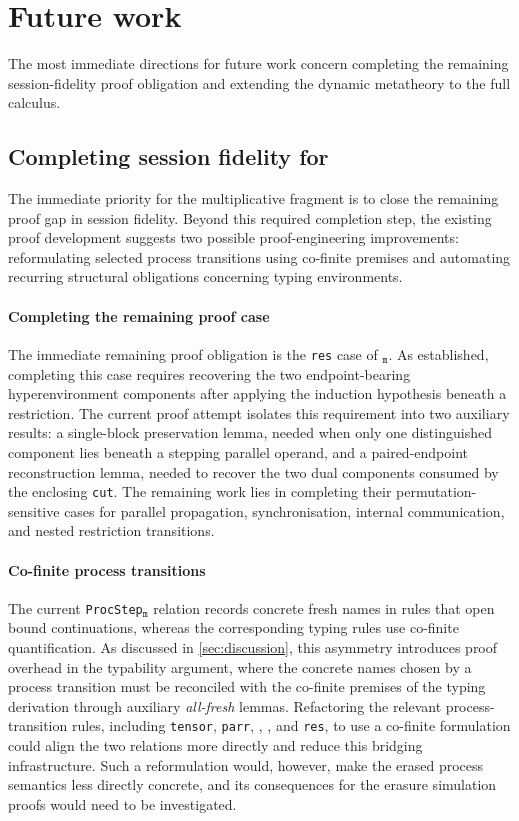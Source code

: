 \section{Future work}\label{sec:future}
The most immediate directions for future work concern completing the remaining session-fidelity proof obligation and extending the dynamic metatheory to the full \pill{} calculus.

\subsection{Completing session fidelity for \texorpdfstring{\pimll{}}{PiMLL}} \label{subsec:future-completing-pimll}
The immediate priority for the multiplicative fragment is to close the remaining proof gap in session fidelity. Beyond this required completion step, the existing proof development suggests two possible proof-engineering improvements: reformulating selected process transitions using co-finite premises and automating recurring structural obligations concerning typing environments.

\paragraph{Completing the remaining proof case} The immediate remaining proof obligation is the \texttt{res} case of $_{\texttt{m}}$. As established, completing this case requires recovering the two endpoint-bearing hyperenvironment components after applying the induction hypothesis beneath a restriction. The current proof attempt isolates this requirement into two auxiliary results: a single-block preservation lemma, needed when only one distinguished component lies beneath a stepping parallel operand, and a paired-endpoint reconstruction lemma, needed to recover the two dual components consumed by the enclosing \texttt{cut}. The remaining work lies in completing their permutation-sensitive cases for parallel propagation, synchronisation, internal communication, and nested restriction transitions.

\paragraph{Co-finite process transitions}
The current \texttt{ProcStep}$_{\texttt{m}}$ relation records concrete fresh names in rules that open bound continuations, whereas the corresponding typing rules use co-finite quantification. As discussed in \cref{sec:discussion}, this asymmetry introduces proof overhead in the typability argument, where the concrete names chosen by a process transition must be reconciled with the co-finite premises of the typing derivation through auxiliary \emph{all-fresh} lemmas. Refactoring the relevant process-transition rules, including \texttt{tensor}, \texttt{parr}, , , and \texttt{res}, to use a co-finite formulation could align the two relations more directly and reduce this bridging infrastructure. Such a reformulation would, however, make the erased process semantics less directly concrete, and its consequences for the erasure simulation proofs would need to be investigated.

